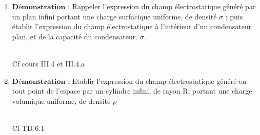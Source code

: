 \begin{enumerate}[label=\arabic{enumi} - , left=0pt, itemsep=1em]
    \item $\textbf{Démonstration :}$ Rappeler l’expression du champ électrostatique généré par un plan infini portant une
    charge surfacique uniforme, de densité $\sigma$ ; puis établir l’expression du champ
    électrostatique à l’intérieur d’un condensateur plan, et de la capacité du condensateur. $\sigma$. \par
    \begin{solution} \\
        Cf cours III.4 et III.4.a
    \end{solution}

    \item $\textbf{Démonstration :}$ Etablir l’expression du champ électrostatique généré en tout point de l’espace par un
    cylindre infini, de rayon R, portant une charge volumique uniforme, de densité $\rho $ \par
    \begin{solution} \\
        Cf TD 6.1
    \end{solution}
\end{enumerate}